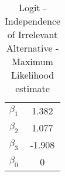 \begin{table}[htb]
\centering
\caption{Logit - Independence of Irrelevant Alternative - Maximum Likelihood estimate}\label{tab:mvIIA}
\begin{tabular}{lc}
 \hline 
$\beta_1$ & 1.382 \\ 
$\beta_2$ & 1.077 \\ 
$\beta_3$ & -1.908 \\ 
$\beta_0$ & 0 \\ 
\hline
\end{tabular}
\end{table}

